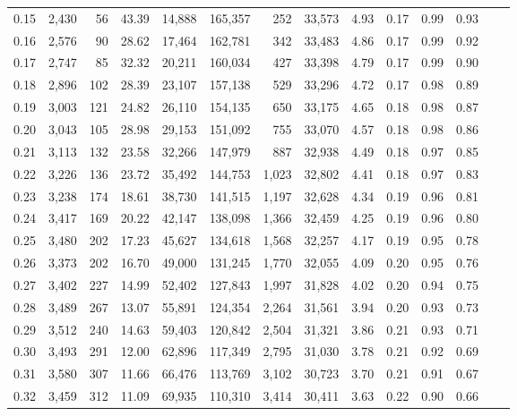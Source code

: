 \begin{tabular}{rrrrrrrrrrrrrr}
0.15 &  2,430 &   56 &   43.39 &   14,888 &  165,357 &     252 &  33,573 &  4.93 &  0.17 &  0.99 &      0.93 \\
0.16 &  2,576 &   90 &   28.62 &   17,464 &  162,781 &     342 &  33,483 &  4.86 &  0.17 &  0.99 &      0.92 \\
0.17 &  2,747 &   85 &   32.32 &   20,211 &  160,034 &     427 &  33,398 &  4.79 &  0.17 &  0.99 &      0.90 \\
0.18 &  2,896 &  102 &   28.39 &   23,107 &  157,138 &     529 &  33,296 &  4.72 &  0.17 &  0.98 &      0.89 \\
0.19 &  3,003 &  121 &   24.82 &   26,110 &  154,135 &     650 &  33,175 &  4.65 &  0.18 &  0.98 &      0.87 \\
0.20 &  3,043 &  105 &   28.98 &   29,153 &  151,092 &     755 &  33,070 &  4.57 &  0.18 &  0.98 &      0.86 \\
0.21 &  3,113 &  132 &   23.58 &   32,266 &  147,979 &     887 &  32,938 &  4.49 &  0.18 &  0.97 &      0.85 \\
0.22 &  3,226 &  136 &   23.72 &   35,492 &  144,753 &   1,023 &  32,802 &  4.41 &  0.18 &  0.97 &      0.83 \\
0.23 &  3,238 &  174 &   18.61 &   38,730 &  141,515 &   1,197 &  32,628 &  4.34 &  0.19 &  0.96 &      0.81 \\
0.24 &  3,417 &  169 &   20.22 &   42,147 &  138,098 &   1,366 &  32,459 &  4.25 &  0.19 &  0.96 &      0.80 \\
0.25 &  3,480 &  202 &   17.23 &   45,627 &  134,618 &   1,568 &  32,257 &  4.17 &  0.19 &  0.95 &      0.78 \\
0.26 &  3,373 &  202 &   16.70 &   49,000 &  131,245 &   1,770 &  32,055 &  4.09 &  0.20 &  0.95 &      0.76 \\
0.27 &  3,402 &  227 &   14.99 &   52,402 &  127,843 &   1,997 &  31,828 &  4.02 &  0.20 &  0.94 &      0.75 \\
0.28 &  3,489 &  267 &   13.07 &   55,891 &  124,354 &   2,264 &  31,561 &  3.94 &  0.20 &  0.93 &      0.73 \\
0.29 &  3,512 &  240 &   14.63 &   59,403 &  120,842 &   2,504 &  31,321 &  3.86 &  0.21 &  0.93 &      0.71 \\
0.30 &  3,493 &  291 &   12.00 &   62,896 &  117,349 &   2,795 &  31,030 &  3.78 &  0.21 &  0.92 &      0.69 \\
0.31 &  3,580 &  307 &   11.66 &   66,476 &  113,769 &   3,102 &  30,723 &  3.70 &  0.21 &  0.91 &      0.67 \\
0.32 &  3,459 &  312 &   11.09 &   69,935 &  110,310 &   3,414 &  30,411 &  3.63 &  0.22 &  0.90 &      0.66 \\

\end{tabular}
